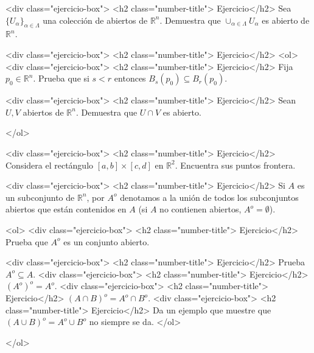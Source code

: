 \documentclass{article}
\theoremstyle{definition}
\begin{document}
<div class="ejercicio-box"> <h2 class="number-title"> Ejercicio</h2> Sea $\{U_\alpha\}_{\alpha \in \Lambda}$ una colección de abiertos de $\mathbb{R}^n$. Demuestra que
$\cup_{\alpha \in \Lambda}U_\alpha$ es abierto de $\mathbb{R}^n$.

<div class="ejercicio-box"> <h2 class="number-title"> Ejercicio</h2> 
	<ol>
	<div class="ejercicio-box"> <h2 class="number-title"> Ejercicio</h2> Fija $p_0\in \mathbb{R}^n$. Prueba que si $s<r$ entonces $B_s(p_0) \subseteq B_r(p_0)$.
	
	<div class="ejercicio-box"> <h2 class="number-title"> Ejercicio</h2> Sean $U, V$ abiertos de $\mathbb{R}^n$. Demuestra que $U\cap V$ es abierto.
	
	</ol>

	<div class="ejercicio-box"> <h2 class="number-title"> Ejercicio</h2> Considera el rectángulo $[a,b]\times [c,d]$ en $\mathbb{R}^2$. Encuentra sus puntos frontera.	
	
	<div class="ejercicio-box"> <h2 class="number-title"> Ejercicio</h2> Si $A $ es un subconjunto de $\mathbb{R}^n$, por $A^o$ denotamos a la unión de todos los subconjuntos
	abiertos que están contenidos en $A$ (si $A$ no contienen abiertos, $A^o=\emptyset$). 
	
	<ol> 
	<div class="ejercicio-box"> <h2 class="number-title"> Ejercicio</h2> Prueba  que
	$A^o$ es un conjunto abierto. 

	<div class="ejercicio-box"> <h2 class="number-title"> Ejercicio</h2> Prueba $A^o \subseteq A$.
	<div class="ejercicio-box"> <h2 class="number-title"> Ejercicio</h2> $(A^o)^o=A^o$.
	<div class="ejercicio-box"> <h2 class="number-title"> Ejercicio</h2> $(A\cap B)^o=A^o \cap B^o$.
	<div class="ejercicio-box"> <h2 class="number-title"> Ejercicio</h2> Da un ejemplo que muestre que $(A\cup B)^o=A^o\cup B^o$ no siempre se da.
</ol>	

  </ol>
  


  
       
\end{document}
